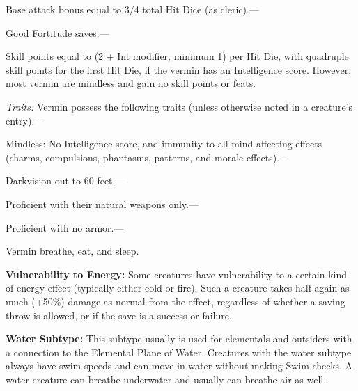 \documentclass{article}
\begin{document}
Base attack bonus equal to 3/4 total Hit Dice (as cleric).---

Good Fortitude saves.---

Skill points equal to (2 + Int modifier, minimum 1) per Hit Die, with quadruple 
skill points for the first Hit Die, if the vermin has an Intelligence score. However, 
most vermin are mindless and gain no skill points or feats.

\textit{Traits: }Vermin possess the following traits (unless otherwise noted in 
a creature's entry).---

Mindless: No Intelligence score, and immunity to all mind-affecting effects (charms, 
compulsions, phantasms, patterns, and morale effects).---

Darkvision out to 60 feet.---

Proficient with their natural weapons only.---

Proficient with no armor.---

Vermin breathe, eat, and sleep.

\vspace{12pt}
\textbf{Vulnerability to Energy:} Some creatures have vulnerability to a certain 
kind of energy effect (typically either cold or fire). Such a creature takes half 
again as much (+50\%) damage as normal from the effect, regardless of whether a 
saving throw is allowed, or if the save is a success or failure.

\vspace{12pt}
\textbf{Water Subtype:} This subtype usually is used for elementals and outsiders 
with a connection to the Elemental Plane of Water. Creatures with the water subtype 
always have swim speeds and can move in water without making Swim checks. A water 
creature can breathe underwater and usually can breathe air as well. 

\newpage
\end{document}
